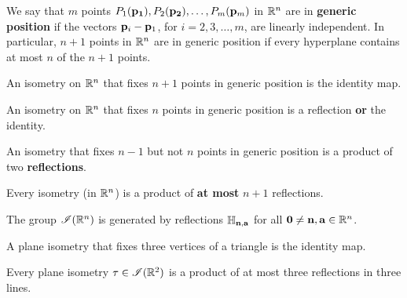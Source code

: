 
\begin{definition} 
    We say that \(m\) points \(P_1(\mathbf{p_1}), P_2(\mathbf{p_2}), \dots, P_m(\mathbf{p}_m)\) in \(\mathbb{R}^n\) are in \textbf{generic position} if the vectors \(\mathbf{p}_i - \mathbf{p}_1\), for \(i = 2, 3, \dots, m\), are linearly independent. In particular, \(n + 1\) points in \(\mathbb{R}^n\) are in generic position if every hyperplane contains at most \(n\) of the \(n + 1\) points.
\end{definition}

\begin{theorem}
    \begin{statements}{}
        \item An isometry on \(\mathbb{R}^n\) that fixes \(n + 1\) points in generic position is the identity map.
        \item An isometry on \(\mathbb{R}^n\) that fixes \(n\) points in generic position is a reflection \textbf{or} the identity.
        \item An isometry that fixes \(n - 1\) but not \(n\) points in generic position is a product of two \textbf{reflections}.
        \item Every isometry (in \(\mathbb{R}^n\)) is a product of \textbf{at most} \(n + 1\) reflections.
    \end{statements}
\end{theorem}

\begin{corollary}
    The group \(\mathscr{I}(\mathbb{R}^n)\) is generated by reflections \(\mathbb{H}_{\mathbf{n}, \mathbf{a}}\) for all \(\mathbf{0} \neq \mathbf{n}, \mathbf{a} \in \mathbb{R}^n\).
\end{corollary}

\begin{corollary}
    \begin{statements}{}
        \item A plane isometry that fixes three vertices of a triangle is the identity map.
        \item Every plane isometry \(\tau \in \mathscr{I}(\mathbb{R}^2)\) is a product of at most three reflections in three lines.
    \end{statements}
\end{corollary}

\newpage